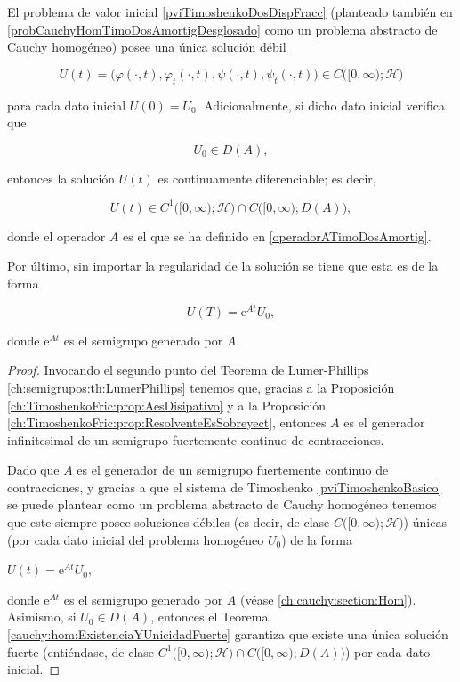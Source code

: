 \begin{Teorema}
    \label{ch:TimoshenkoFric:prop:existenciaYUnicidad}
    
    El problema de valor inicial \eqref{pviTimoshenkoDosDispFracc} (planteado también en \eqref{probCauchyHomTimoDosAmortigDesglosado} como un problema abstracto de Cauchy homogéneo) posee una única solución débil

    \[U(t) = \big(\varphi(\cdot, t), \varphi_t(\cdot, t), \psi(\cdot, t), \psi_t(\cdot, t)\big) \in C\big([0,\infty);\mathcal{H}\big)\]

    para cada dato inicial $U(0) = U_0$. Adicionalmente, si dicho dato inicial verifica que

    \[U_0 \in D(A),\]

    entonces la solución $U(t)$ es continuamente diferenciable; es decir,

    \[U(t) \in C^1\big([0,\infty);\mathcal{H}\big) \cap C\big([0,\infty) ; D(A)\big),\]

    donde el operador $A$ es el que se ha definido en \eqref{operadorATimoDosAmortig}. 
    
    Por último, sin importar la regularidad de la solución se tiene que esta es de la forma

    \[U(T) = \mathrm{e}^{At}U_0,\]

    donde $\mathrm{e}^{At}$ es el semigrupo generado por $A$.
\end{Teorema}

\begin{proof}
    Invocando el segundo punto del Teorema de Lumer-Phillips \ref{ch:semigrupos:th:LumerPhillips} tenemos que, gracias a la Proposición \ref{ch:TimoshenkoFric:prop:AesDisipativo} y a la Proposición \ref{ch:TimoshenkoFric:prop:ResolventeEsSobreyect}, entonces $A$ es el generador infinitesimal de un semigrupo fuertemente continuo de contracciones.

    Dado que $A$ es el generador de un semigrupo fuertemente continuo de contracciones, y gracias a que el sistema de Timoshenko \eqref{pviTimoshenkoBasico} se puede plantear como un problema abstracto de Cauchy homogéneo tenemos que este siempre posee soluciones débiles (es decir, de clase $C\big([0,\infty);\mathcal{H}\big)$) únicas (por cada dato inicial del problema homogéneo $U_0$) de la forma 

    $U(t) = \mathrm{e}^{At}U_0,$

    donde $\mathrm{e}^{At}$ es el semigrupo generado por $A$ (véase \ref{ch:cauchy:section:Hom}). Asimismo, si $U_0 \in D(A)$, entonces el Teorema \ref{cauchy:hom:ExistenciaYUnicidadFuerte} garantiza que existe una única solución fuerte (entiéndase, de clase $C^1\big([0,\infty);\mathcal{H}\big) \cap C\big([0,\infty) ; D(A)\big)$) por cada dato inicial. 
\end{proof}

